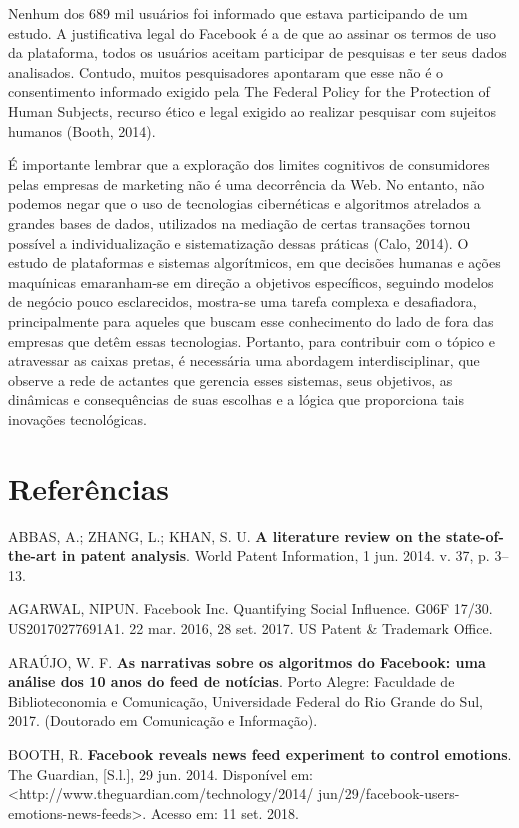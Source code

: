 Nenhum dos 689 mil usuários foi informado que estava participando de um
estudo. A justificativa legal do Facebook é a de que ao assinar os
termos de uso da plataforma, todos os usuários aceitam participar de
pesquisas e ter seus dados analisados. Contudo, muitos pesquisadores
apontaram que esse não é o consentimento informado exigido pela The
Federal Policy for the Protection of Human Subjects, recurso ético e
legal exigido ao realizar pesquisar com sujeitos humanos (Booth, 2014).

É importante lembrar que a exploração dos limites cognitivos de
consumidores pelas empresas de marketing não é uma decorrência da Web.
No entanto, não podemos negar que o uso de tecnologias cibernéticas e
algoritmos atrelados a grandes bases de dados, utilizados na mediação de
certas transações tornou possível a individualização e sistematização
dessas práticas (Calo, 2014). O estudo de plataformas e sistemas
algorítmicos, em que decisões humanas e ações maquínicas emaranham-se em
direção a objetivos específicos, seguindo modelos de negócio pouco
esclarecidos, mostra-se uma tarefa complexa e desafiadora,
principalmente para aqueles que buscam esse conhecimento do lado de fora
das empresas que detêm essas tecnologias. Portanto, para contribuir com
o tópico e atravessar as caixas pretas, é necessária uma abordagem
interdisciplinar, que observe a rede de actantes que gerencia esses
sistemas, seus objetivos, as dinâmicas e consequências de suas escolhas
e a lógica que proporciona tais inovações tecnológicas.

\section{Referências}

ABBAS, A.; ZHANG, L.; KHAN, S. U. \textbf{A literature review on the
state-of-the-art in patent analysis}. World Patent Information, 1 jun.
2014. v. 37, p. 3--13.

AGARWAL, NIPUN. Facebook Inc. Quantifying Social Influence. 
G06F 17/30. US20170277691A1. 22 mar. 2016, 28 set. 2017. US Patent & 
Trademark Office. 

ARAÚJO, W. F. \textbf{As narrativas sobre os algoritmos do Facebook: uma
análise dos 10 anos do feed de notícias}. Porto Alegre: Faculdade de
Biblioteconomia e Comunicação, Universidade Federal do Rio Grande do
Sul, 2017. (Doutorado em Comunicação e Informação).

BOOTH, R. \textbf{Facebook reveals news feed experiment to control
emotions}. The Guardian, {[}S.l.{]}, 29 jun. 2014. Disponível em:
\textless{}http://www.theguardian.com/technology/2014/
jun/29/facebook-users-emotions-news-feeds\textgreater{}.
Acesso em: 11 set. 2018.

